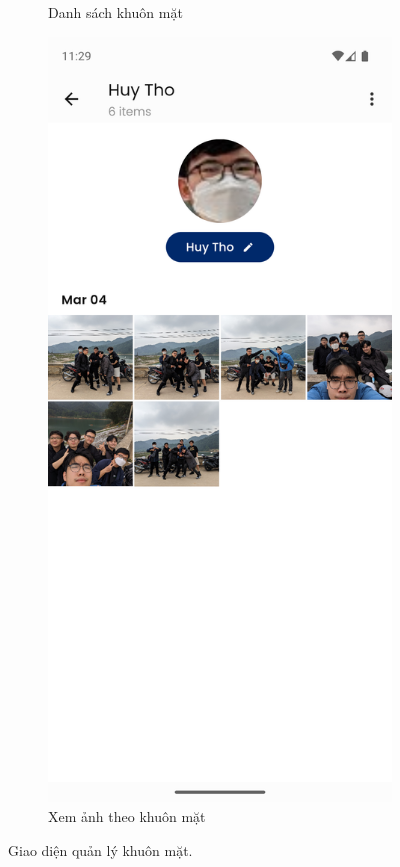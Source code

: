 \begin{figure}[H]
\begin{subfigure}{0.48\textwidth}
        \caption{Danh sách khuôn mặt}
    \end{subfigure}
    \hfill
    \begin{subfigure}{0.48\textwidth}
        \includegraphics[width=1\linewidth]{figures/c4/4-2/face_2.png} 
        \caption{Xem ảnh theo khuôn mặt}
    \end{subfigure}
    \caption{Giao diện quản lý khuôn mặt.}
    \label{fig:explore_face}
\end{figure}